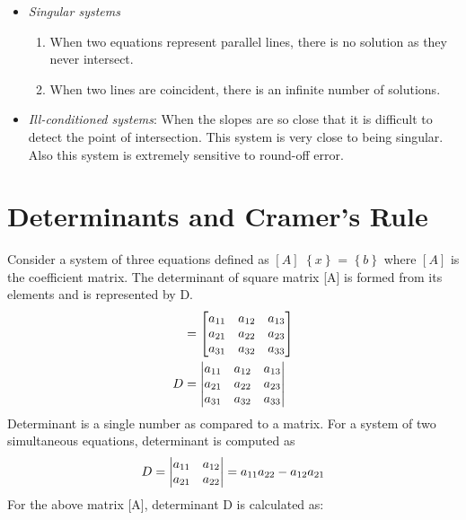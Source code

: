 \documentclass[book.tex]{subfiles}
\begin{document}
\begin{itemize}
	\item \textit{Singular systems}
	\begin{enumerate}
		\item When two equations represent parallel lines, there is no solution as they never intersect.
		\item When two lines are coincident, there is an infinite number of solutions.
	\end{enumerate}
	\item \textit{Ill-conditioned systems}: When the slopes are so close that it is difficult to detect the point of intersection. This system is very close to being singular. Also this system is extremely sensitive to round-off error.
\end{itemize}
\section{Determinants and Cramer's Rule}
Consider a system of three equations defined as $[A]$ $\left\{x\right\}$ = $\left\{b\right\}$ where $[A]$ is the coefficient matrix. The determinant of square matrix [A] is formed from its elements and is represented by D.
\begin{align}
[A] &=
\begin{bmatrix}
	a_{11} & a_{12} & a_{13} \\ 
	a_{21} & a_{22} & a_{23} \\ 
	a_{31} & a_{32} & a_{33}
\end{bmatrix}\\
D &= 
\begin{vmatrix}
a_{11} & a_{12} & a_{13} \\ 
a_{21} & a_{22} & a_{23} \\ 
a_{31} & a_{32} & a_{33}
\end{vmatrix}
\vspace{-6pt}
\end{align}
Determinant is a single number as compared to a matrix. For a system of two simultaneous equations, determinant is computed as 
\vspace{-8pt}
\begin{align}
D =
\begin{vmatrix}
a_{11} & a_{12} \\ 
a_{21} & a_{22}  
\end{vmatrix}
= a_{11} a_{22} - a_{12} a_{21}
\vspace{-8pt}
\end{align}
For the above matrix [A], determinant D is calculated as:
\end{document}
